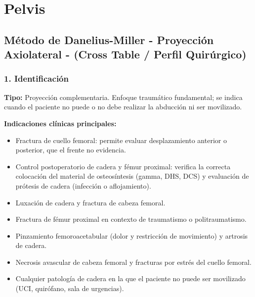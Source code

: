 	
	\twocolumn
	\clearpage
	
	
	
	
	\section{Pelvis}
	
	\subsection{Método de Danelius-Miller - Proyección Axiolateral - (Cross Table / Perfil Quirúrgico)}
	
	\subsubsection*{1. Identificación}
	
	\textbf{Tipo:} Proyección complementaria. Enfoque traumático fundamental; se indica cuando el paciente no puede o no debe realizar la abducción ni ser movilizado.
	
	\textbf{Indicaciones clínicas principales:}
	\begin{itemize}
		\item Fractura de cuello femoral: permite evaluar desplazamiento anterior o posterior, que el frente no evidencia.
		\item Control postoperatorio de cadera y fémur proximal: verifica la correcta colocación del material de osteosíntesis (gamma, DHS, DCS) y evaluación de prótesis de cadera (infección o aflojamiento).
		\item Luxación de cadera y fractura de cabeza femoral.
		\item Fractura de fémur proximal en contexto de traumatismo o politraumatismo.
		\item Pinzamiento femoroacetabular (dolor y restricción de movimiento) y artrosis de cadera.
		\item Necrosis avascular de cabeza femoral y fracturas por estrés del cuello femoral.
		\item Cualquier patología de cadera en la que el paciente no puede ser movilizado (UCI, quirófano, sala de urgencias).
	\end{itemize}
	
